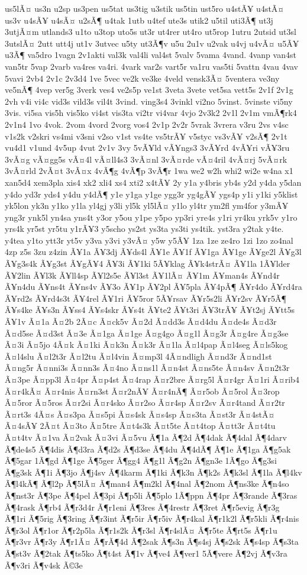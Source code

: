 {us5lÃ¤
us3n
u2sp
us3pen
us5tat
us3tig
u3stik
us5tin
ust5ro
u4stÃ¥
u4stÃ¤
us3v
u4sÃ¥
u4sÃ¤
u2sÃ¶
u4tak
1utb
u4tef
ute3s
utik2
u5til
uti3Ã¶
ut3j
3utjÃ¤m
utlands3
u1to
u3top
uto5s
ut3r
ut4rer
ut4ro
ut5rop
1utru
2utsid
ut3sl
3utslÃ¤
2utt
utt4j
ut1v
3utvec
u5ty
ut3Ã¶v
u5u
2u1v
u2vak
u4vj
u4vÃ¤
u5Ã¥
u3Ã¶
va5dro
1vagn
2v1akti
val3k
val4li
val4st
5valv
5vama
4vand.
4vanp
van4st
van5tr
5vap
2varb
va4res
va4ri.
4vark
var2s
vart5r
va1ru
vas5ti
5vattn
4vau
4vav
5vavi
2vb4
2v1c
2v3d4
1ve
5vec
ve2k
ve3ke
4veld
vensk3Ã¤
5ventera
ve3ny
ve5nÃ¶
4vep
ver5g
3verk
ves4
ve2s5p
ve1st
3veta
3vete
vet5sa
vett5s
2v1f
2v1g
2vh
v4i
vi4c
vid3s
vild3s
vil4t
3vind.
ving3s4
3vinkl
vi2no
5vinst.
5vinste
vi5ny
3vis.
vi5sa
vis5h
vis5ko
vi4st
vis3ta
vi2tr
vi4var
4vjo
2v3k2
2v1l
2v1m
vmÃ¶rk4
2v1n4
1vo
4vok.
2vom
4vord
2vorg
vos4
2v1p
2v2r
5vrak
3vrera
v3ru
2vs
v4sc
v1s2k
v2skri
vs4mi
v3sni
v2so
v1st
vs4te
vs5trÃ¥
v5styc
vs3vÃ¥
v2sÃ¶
2v1t
vu4d1
v1und
4v5up
4vut
2v1v
3vy
5vÃ¥ld
vÃ¥ngs3
3vÃ¥rd
4vÃ¥ri
vÃ¥3ru
3vÃ¤g
vÃ¤gg5s
vÃ¤4l
vÃ¤ll4s3
3vÃ¤nl
3vÃ¤rde
vÃ¤4ril
4vÃ¤rj
5vÃ¤rk
3vÃ¤rld
2vÃ¤t
3vÃ¤x
4vÃ¶g
4vÃ¶p
3vÃ¶r
1wa
we2
w2h
whi2
wi2e
w4na
x1
xan5d4
xem3pla
xis4
xk2
xli4
xs4
xti2
x4tÃ¥
2y
y1a
y4bris
yb4s
y2d
y4da
y5dan
y4do
yd3r
yds4
y4du
y4dÃ¶
y1e
y1ga
y1ge
ygg3r
yg4gÃ¥
ygs4p
y1i
y1ki
y5klist
yk5lon
yk3n
y1ko
y1la
yl4gj
y3li
yl5k
yl5lÃ¤
y1lo
yl4tr
ym2fl
ym4for
y3mÃ¥
yng3r
ynk5l
yn4sa
yns4t
y3or
y5ou
y1pe
y5po
yp3ri
yre4s
y1ri
yr4ku
yrk5v
y1ro
yrs4k
yr5st
yr5tu
y1rÃ¥3
y5scho
ys2st
ys3ta
ys3ti
ys4tik.
yst3ra
y2tak
y4te.
y4tea
y1to
ytt3r
yt5v
y3va
y3vi
y3vÃ¤
y5w
y5Ã¥
1za
1ze
ze4ro
1zi
1zo
zo4nal
4zp
z5s
3zu
z4zin
Ã¥1a
Ã¥3dj
Ã¥ds4l
Ã¥1e
Ã¥1f
Ã¥1ga
Ã¥1ge
Ã¥ge2l
Ã¥g3l
Ã¥g3s4k
Ã¥g3st
Ã¥gÃ¥4
Ã¥3i
Ã¥1ki
5Ã¥klag
Ã¥k4strÃ¤
Ã¥1la
1Ã¥lder
Ã¥2lin
Ã¥l3k
Ã¥ll4sp
Ã¥l2s5e
Ã¥l3st
Ã¥1lÃ¤
Ã¥1m
Ã¥man4s
Ã¥nd4r
Ã¥n4du
Ã¥ns4t
Ã¥ns4v
Ã¥3o
Ã¥1p
Ã¥2pl
Ã¥5pla
Ã¥4pÃ¶
Ã¥r4do
Ã¥rd4ra
Ã¥rd2s
Ã¥rd4s3t
Ã¥4rel
Ã¥1ri
Ã¥5ror
5Ã¥rsav
Ã¥r5s2li
Ã¥r2sv
Ã¥r5Ã¶
Ã¥s4ke
Ã¥s3n
Ã¥ss4
Ã¥s4skr
Ã¥s4t
Ã¥te2
Ã¥t3ri
Ã¥3trÃ¥
Ã¥t2sj
Ã¥tt5s
Ã¥1v
Ã¤1a
Ã¤2b
2Ã¤c
Ã¤ck5v
Ã¤2d
Ã¤dd3s
Ã¤d4du
Ã¤de4s
Ã¤d3r
Ã¤d5se
Ã¤d3st
Ã¤3e
Ã¤1ga
Ã¤1ge
Ã¤g4go
Ã¤g1l
Ã¤g3r
Ã¤g4re
Ã¤g3se
Ã¤3i
Ã¤5jo
4Ã¤k
Ã¤1ki
Ã¤k3n
Ã¤k3r
Ã¤1la
Ã¤l4pap
Ã¤l4seg
Ã¤ls5kog
Ã¤l4slu
Ã¤l2t3r
Ã¤l2tu
Ã¤l4vin
Ã¤mp3l
4Ã¤ndligh
Ã¤nd3r
Ã¤nd1st
Ã¤ng5r
Ã¤nni3s
Ã¤nn3s
Ã¤4no
Ã¤ns1l
Ã¤n4st
Ã¤ns5te
Ã¤n4sv
Ã¤n2t3r
Ã¤3pe
Ã¤pp3l
Ã¤4pr
Ã¤p4st
Ã¤4rap
Ã¤r2bre
Ã¤rg5l
Ã¤r4gr
Ã¤1ri
Ã¤rib4
Ã¤r4kÃ¤
Ã¤r4nis
Ã¤rn3st
Ã¤r2nÃ¥
Ã¤r4nÃ¶
Ã¤r5ob
Ã¤5rol
Ã¤3rop
Ã¤5ror
Ã¤5ros
Ã¤r2si
Ã¤r4sko
Ã¤r2so
Ã¤r4sp
Ã¤r2sv
Ã¤r4tand
Ã¤r2tr
Ã¤rt3s
4Ã¤s
Ã¤s3pa
Ã¤s5pi
Ã¤s4sk
Ã¤s4sp
Ã¤s3ta
Ã¤st3r
Ã¤4stÃ¤
Ã¤4sÃ¥
2Ã¤t
Ã¤3to
Ã¤5tre
Ã¤t4s3k
Ã¤t5te
Ã¤t4top
Ã¤tt3r
Ã¤t4tu
Ã¤t4tv
Ã¤1va
Ã¤2vak
Ã¤3vi
Ã¤5vu
Ã¶1a
Ã¶2d
Ã¶4dak
Ã¶4dal
Ã¶4darv
Ã¶de4s5
Ã¶4dis
Ã¶d3ra
Ã¶d2s
Ã¶d3se
Ã¶4du
Ã¶4dÃ¶
Ã¶1e
Ã¶1ga
Ã¶g5ak
Ã¶5gar
1Ã¶gd
Ã¶1ge
Ã¶5ger
Ã¶gg4
Ã¶g1l
Ã¶g2n
Ã¶gn3e
1Ã¶go
Ã¶g3si
Ã¶g3sk
Ã¶1i
Ã¶3jo
Ã¶j4sv
Ã¶4karm
Ã¶1ki
Ã¶k3n
Ã¶k2s
Ã¶k3sl
Ã¶1la
Ã¶l4kv
Ã¶l4kÃ¶
Ã¶l2p
Ã¶5lÃ¤
Ã¶man4
Ã¶m2kl
Ã¶4nal
Ã¶2nom
Ã¶ns3ke
Ã¶n4so
Ã¶nst3r
Ã¶3pe
Ã¶4pel
Ã¶3pi
Ã¶p5li
Ã¶5plo
1Ã¶ppn
Ã¶4pr
Ã¶3rande
Ã¶3ras
Ã¶4rask
Ã¶rb4
Ã¶r3d4r
Ã¶r1eni
Ã¶3res
Ã¶4restr
Ã¶3ret
Ã¶r5evig
Ã¶r3g
Ã¶1ri
Ã¶5rig
Ã¶3ring
Ã¶r3int
Ã¶r5ir
Ã¶r5iv
Ã¶r4kal
Ã¶r1k2l
Ã¶r5kli
Ã¶r4nis
Ã¶r3ol
Ã¶r1or
Ã¶r2p5la
Ã¶r1s2k
Ã¶r3sl
Ã¶r4slÃ¤
Ã¶r5te
Ã¶rt5s
Ã¶r1u
Ã¶r3vr
Ã¶r3y
Ã¶r1Ã¤
Ã¶rÃ¶4d
Ã¶2sak
Ã¶s3n
Ã¶s4sj
Ã¶s2sk
Ã¶s4sp
Ã¶s3ta
Ã¶st3v
Ã¶2tak
Ã¶ts5ko
Ã¶t4st
Ã¶1v
Ã¶ve4
Ã¶ver1
5Ã¶vere
Ã¶2vj
Ã¶v3ra
Ã¶v3ri
Ã¶v4sk
Ã©3e
}